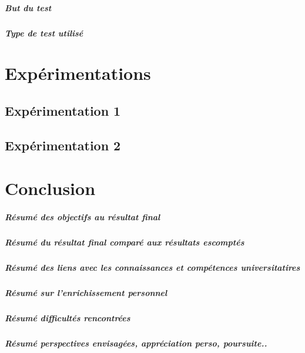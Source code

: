 \documentclass[
	headsepline=on,
	footsepline=on,
	twoside=off,
	abstract=on,
	DIV=10
]{scrreprt}
\begin{document}
				\paragraph{But du test}
				\paragraph{Type de test utilisé}
				
		\chapter{Expérimentations}
			\section{Expérimentation 1}
			\section{Expérimentation 2}
			
			
		\chapter{Conclusion}
			\paragraph{Résumé des objectifs au résultat final}
			
			\paragraph{Résumé du résultat final comparé aux résultats escomptés}
			
			\paragraph{Résumé des liens avec les connaissances et compétences universitatires}
			
			\paragraph{Résumé sur l'enrichissement personnel}
			
			\paragraph{Résumé difficultés rencontrées}
			
			\paragraph{Résumé perspectives envisagées, appréciation perso, poursuite..}
		
\end{document}
